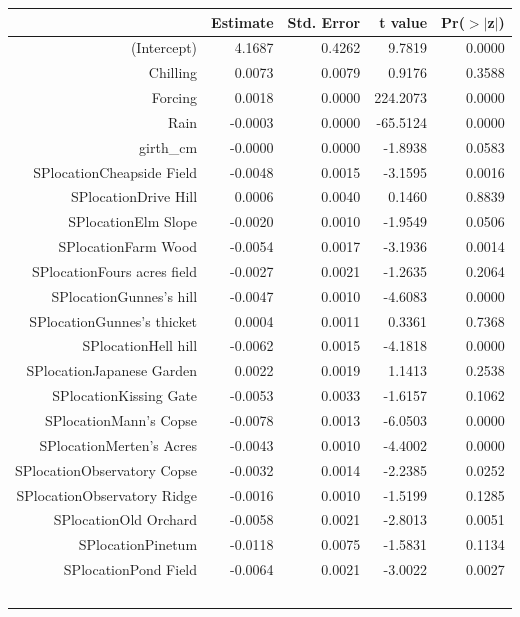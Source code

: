 \begin{table}[ht]
\centering
\begin{tabular}{rrrrr}
  \hline
 & Estimate & Std. Error & t value & Pr($>$$|$z$|$) \\ 
  \hline
(Intercept) & 4.1687 & 0.4262 & 9.7819 & 0.0000 \\ 
  Chilling & 0.0073 & 0.0079 & 0.9176 & 0.3588 \\ 
  Forcing & 0.0018 & 0.0000 & 224.2073 & 0.0000 \\ 
  Rain & -0.0003 & 0.0000 & -65.5124 & 0.0000 \\ 
  girth\_cm & -0.0000 & 0.0000 & -1.8938 & 0.0583 \\ 
  SPlocationCheapside Field & -0.0048 & 0.0015 & -3.1595 & 0.0016 \\ 
  SPlocationDrive Hill & 0.0006 & 0.0040 & 0.1460 & 0.8839 \\ 
  SPlocationElm Slope & -0.0020 & 0.0010 & -1.9549 & 0.0506 \\ 
  SPlocationFarm Wood & -0.0054 & 0.0017 & -3.1936 & 0.0014 \\ 
  SPlocationFours acres field & -0.0027 & 0.0021 & -1.2635 & 0.2064 \\ 
  SPlocationGunnes's hill & -0.0047 & 0.0010 & -4.6083 & 0.0000 \\ 
  SPlocationGunnes's thicket & 0.0004 & 0.0011 & 0.3361 & 0.7368 \\ 
  SPlocationHell hill & -0.0062 & 0.0015 & -4.1818 & 0.0000 \\ 
  SPlocationJapanese Garden & 0.0022 & 0.0019 & 1.1413 & 0.2538 \\ 
  SPlocationKissing Gate & -0.0053 & 0.0033 & -1.6157 & 0.1062 \\ 
  SPlocationMann's Copse & -0.0078 & 0.0013 & -6.0503 & 0.0000 \\ 
  SPlocationMerten's Acres & -0.0043 & 0.0010 & -4.4002 & 0.0000 \\ 
  SPlocationObservatory Copse & -0.0032 & 0.0014 & -2.2385 & 0.0252 \\ 
  SPlocationObservatory Ridge & -0.0016 & 0.0010 & -1.5199 & 0.1285 \\ 
  SPlocationOld Orchard & -0.0058 & 0.0021 & -2.8013 & 0.0051 \\ 
  SPlocationPinetum & -0.0118 & 0.0075 & -1.5831 & 0.1134 \\ 
  SPlocationPond Field & -0.0064 & 0.0021 & -3.0022 & 0.0027 \\ 
$$
\end{tabular}
\end{table}
